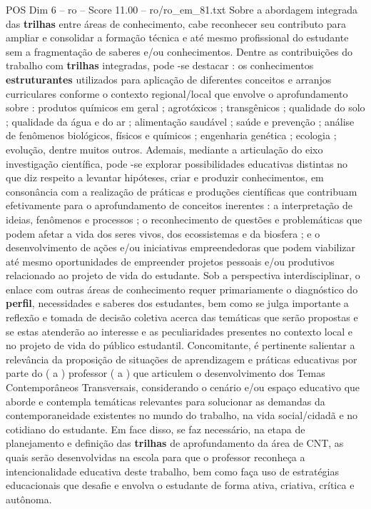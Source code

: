 \begin{textsample}{POS Dim 6 – ro – Score 11.00 – ro/ro\_em\_81.txt}
Sobre a abordagem integrada das \textbf{trilhas} entre áreas de conhecimento, cabe reconhecer seu contributo para ampliar e consolidar a formação técnica e até mesmo profissional do estudante sem a fragmentação de saberes e/ou conhecimentos.
Dentre as contribuições do trabalho com \textbf{trilhas} integradas, pode -se destacar : os conhecimentos \textbf{estruturantes} utilizados para aplicação de diferentes conceitos e arranjos curriculares conforme o contexto regional/local que envolve o aprofundamento sobre : produtos químicos em geral ; agrotóxicos ; transgênicos ; qualidade do solo ; qualidade da água e do ar ; alimentação saudável ; saúde e prevenção ; análise de fenômenos biológicos, físicos e químicos ; engenharia genética ; ecologia ; evolução, dentre muitos outros.
Ademais, mediante a articulação do eixo investigação científica, pode -se explorar possibilidades educativas distintas no que diz respeito a levantar hipóteses, criar e produzir conhecimentos, em consonância com a realização de práticas e produções científicas que contribuam efetivamente para o aprofundamento de conceitos inerentes : a interpretação de ideias, fenômenos e processos ; o reconhecimento de questões e problemáticas que podem afetar a vida dos seres vivos, dos ecossistemas e da biosfera ; e o desenvolvimento de ações e/ou iniciativas empreendedoras que podem viabilizar até mesmo oportunidades de empreender projetos pessoais e/ou produtivos relacionado ao projeto de vida do estudante.
Sob a perspectiva interdisciplinar, o enlace com outras áreas de conhecimento requer primariamente o diagnóstico do \textbf{perfil}, necessidades e saberes dos estudantes, bem como se julga importante a reflexão e tomada de decisão coletiva acerca das temáticas que serão propostas e se estas atenderão ao interesse e as peculiaridades presentes no contexto local e no projeto de vida do público estudantil.
Concomitante, é pertinente salientar a relevância da proposição de situações de aprendizagem e práticas educativas por parte do ( a ) professor ( a ) que articulem o desenvolvimento dos Temas Contemporâneos Transversais, considerando o cenário e/ou espaço educativo que aborde e contempla temáticas relevantes para solucionar as demandas da contemporaneidade existentes no mundo do trabalho, na vida social/cidadã e no cotidiano do estudante.
Em face disso, se faz necessário, na etapa de planejamento e definição das \textbf{trilhas} de aprofundamento da área de CNT, as quais serão desenvolvidas na escola para que o professor reconheça a intencionalidade educativa deste trabalho, bem como faça uso de estratégias educacionais que desafie e envolva o estudante de forma ativa, criativa, crítica e autônoma.

\end{textsample}
